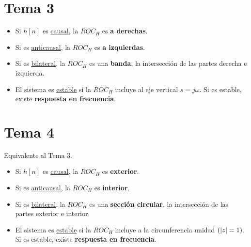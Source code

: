 \documentclass[a4paper]{book}
\begin{document}
\begin{multicols}{2}
	\columnbreak
	\section*{Tema 3}
	\begin{itemize}
		\item Si $h[n]$ es \underline{causal}, la $ROC_H$ es \textbf{a derechas}.
		\item Si es \underline{anticausal}, la $ROC_H$ es \textbf{a izquierdas}.
		\item Si es \underline{bilateral}, la $ROC_H$ es una \textbf{banda}, la intersección de las partes derecha e izquierda.
		\item El sistema es \underline{estable} si la $ROC_H$ incluye al eje vertical $s=j\omega$. Si es estable, existe \textbf{respuesta en frecuencia}.
	\end{itemize}
	\section*{Tema 4}
	Equivalente al Tema 3.
	\begin{itemize}
		\item Si $h[n]$ es \underline{causal}, la $ROC_H$ es \textbf{exterior}.
		\item Si es \underline{anticausal}, la $ROC_H$ es \textbf{interior}.
		\item Si es \underline{bilateral}, la $ROC_H$ es una \textbf{sección circular}, la intersección de las partes exterior e interior.
		\item El sistema es \underline{estable} si la $ROC_H$ incluye a la circunferencia unidad $\left( \abs{z} = 1 \right)$. Si es estable, existe \textbf{respuesta en frecuencia}.
	\end{itemize}
\end{multicols}



% 
% 
\end{document}
